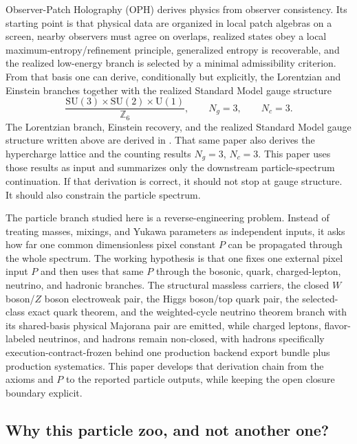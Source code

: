 \documentclass[11pt]{article}
\newcommand{\SU}{\mathrm{SU}}
\newcommand{\U}{\mathrm{U}}
\begin{document}
Observer-Patch Holography (OPH) derives physics from observer consistency. Its
starting point is that physical data are organized in local patch algebras on a screen, nearby
observers must agree on overlaps, realized states obey a local maximum-entropy/refinement
principle, generalized entropy is recoverable, and the realized low-energy branch is selected by a
minimal admissibility criterion. From that basis one can derive, conditionally but explicitly, the
Lorentzian and Einstein branches together with the realized Standard Model gauge structure
\[
\frac{\SU(3)\times\SU(2)\times\U(1)}{\mathbb Z_6},
\qquad
N_g=3,
\qquad
N_c=3.
\]
The Lorentzian branch, Einstein recovery, and the realized Standard Model gauge structure written
above are derived in \cite{ophcompact}. That same paper also derives the hypercharge lattice and
the counting results \(N_g=3\), \(N_c=3\). This paper uses those results as input and summarizes only the
downstream particle-spectrum continuation. If that derivation is correct, it should not stop at gauge structure. It should also constrain the
particle spectrum.

The particle branch studied here is a reverse-engineering problem. Instead of treating masses,
mixings, and Yukawa parameters as independent inputs, it asks how far one common dimensionless
pixel constant \(P\) can be propagated through the whole spectrum. The working hypothesis is that
one fixes one external pixel input \(P\) and then uses that same \(P\)
through the bosonic, quark, charged-lepton, neutrino, and hadronic branches. The structural
massless carriers, the closed \(W\) boson/\(Z\) boson electroweak pair, the Higgs boson/top quark pair,
the selected-class exact quark theorem, and the weighted-cycle neutrino theorem branch with its shared-basis physical Majorana pair are emitted, while charged leptons, flavor-labeled neutrinos, and
hadrons remain non-closed, with hadrons specifically execution-contract-frozen behind one production backend export bundle plus production systematics. This paper develops that derivation chain from the axioms and \(P\) to the
reported particle outputs, while keeping the open closure boundary explicit.

\subsection{Why this particle zoo, and not another one?}
\end{document}
